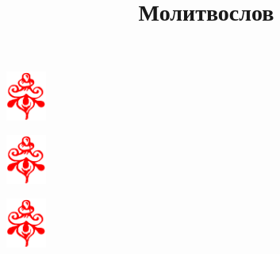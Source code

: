 \documentclass[12pt,oneside, a4paper]{book}
\title{\Huge\bfseries Молитвослов}
\author{}
\date{}
\begin{document}
\maketitle
\tableofcontents


\nopagebreak
\begin{center}
\includegraphics[width=0.1\textwidth]{uzor_end_red}
\end{center}


\nopagebreak
\begin{center}
\includegraphics[width=0.1\textwidth]{uzor_end_red}
\end{center}


\nopagebreak
\begin{center}
\includegraphics[width=0.1\textwidth]{uzor_end_red}
\end{center}
\end{document}
